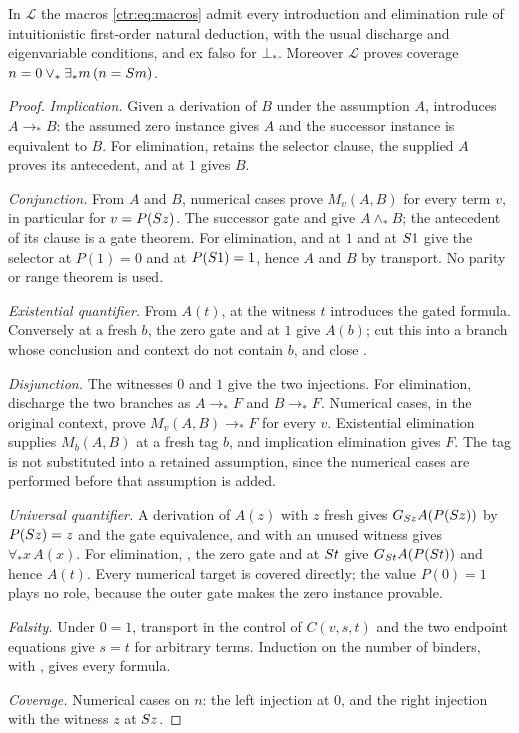 \begin{lemma}\label{ctr:lem:macros}
In $\mathcal L$ the macros \eqref{ctr:eq:macros} admit every introduction and elimination
rule of intuitionistic first-order natural deduction, with the usual discharge and
eigenvariable conditions, and ex falso for $\bot_*$. Moreover $\mathcal L$ proves coverage
$n=0\lor_*\exists_*m\,(n=S m)$.
\end{lemma}
\begin{proof}
\emph{Implication.} Given a derivation of $B$ under the assumption $A$, 
introduces $A\to_*B$: the assumed zero instance gives $A$ and the successor instance is
equivalent to $B$. For elimination,  retains the selector clause, the supplied
$A$ proves its antecedent, and  at $1$ gives $B$.

\emph{Conjunction.} From $A$ and $B$, numerical cases prove $M_v(A,B)$ for every term $v$,
in particular for $v=P(S z)$. The successor gate and  give $A\land_*B$;
the antecedent of its clause is a gate theorem. For elimination,  and
 at $1$ and at $S 1$ give the selector at $P(1)=0$ and at $P(S 1)=1$,
hence $A$ and $B$ by transport. No parity or range theorem is used.

\emph{Existential quantifier.} From $A(t)$,  at the witness $t$ introduces
the gated formula. Conversely  at a fresh $b$, the zero gate and
 at $1$ give $A(b)$; cut this into a branch whose conclusion and context do
not contain $b$, and close .

\emph{Disjunction.} The witnesses $0$ and $1$ give the two injections. For elimination,
discharge the two branches as $A\to_*F$ and $B\to_*F$. Numerical cases, in the original
context, prove $M_v(A,B)\to_*F$ for every $v$. Existential elimination supplies
$M_b(A,B)$ at a fresh tag $b$, and implication elimination gives $F$. The tag is not
substituted into a retained assumption, since the numerical cases are performed before that
assumption is added.

\emph{Universal quantifier.} A derivation of $A(z)$ with $z$ fresh gives
$G_{S z}A(P(S z))$ by $P(S z)=z$ and the gate equivalence, and  with
an unused witness gives $\forall_*x\,A(x)$. For elimination, , the zero gate
and  at $S t$ give $G_{S t}A(P(S t))$ and hence $A(t)$. Every
numerical target is covered directly; the value $P(0)=1$ plays no role, because the outer
gate makes the zero instance provable.

\emph{Falsity.} Under $0=1$, transport in the control of $C(v,s,t)$ and the two endpoint
equations give $s=t$ for arbitrary terms. Induction on the number of binders, with
, gives every formula.

\emph{Coverage.} Numerical cases on $n$: the left injection at $0$, and the right injection
with the witness $z$ at $S z$.
\end{proof}

